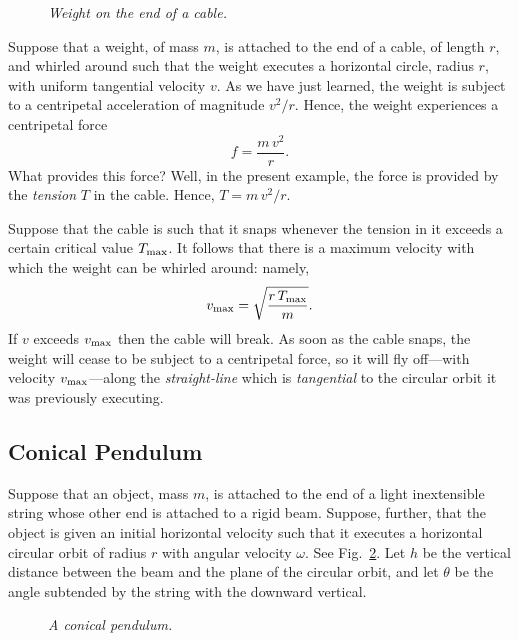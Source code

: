 \begin{figure}
\epsfysize=2.5in
\centerline{}
\caption{\em Weight on the end of a cable.}\label{f60}  
\end{figure}

Suppose that a weight, of mass $m$, is attached to the end of a cable, of
length $r$, and whirled around such that the weight executes a horizontal circle,
 radius $r$, with uniform tangential velocity $v$. As we have just learned,
the weight is subject to a centripetal acceleration of magnitude $v^2/r$. Hence,
the weight experiences a centripetal force
\begin{equation}
f = \frac{m\,v^2}{r}.
\end{equation}
What provides this force? Well, in the present example, the force is provided by the
{\em tension} $T$ in the cable. Hence, $T=m\,v^2/r$. 

Suppose that the cable is such that it  snaps whenever the tension in it
exceeds a certain critical value $T_{\rm max}$. It follows that there is a
maximum velocity with which the weight can be whirled around: namely,
\begin{equation}
v_{\rm max} = \sqrt{\frac{r\,T_{\rm max}}{m}}.
\end{equation}
If $v$ exceeds $v_{\rm max}$ then the cable  will  break. As soon as the cable snaps,
the weight will cease to be subject to a centripetal force, so it will fly off---with 
velocity $v_{\rm max}$---along the {\em straight-line}
which is {\em tangential} to the circular orbit it was previously executing.

\subsection{Conical Pendulum}
Suppose that an object, mass $m$, is attached to the end of a light inextensible
string whose other end is attached to a rigid beam. Suppose, further, that the
object is given an initial horizontal velocity such that it executes a
horizontal circular orbit of radius $r$ with angular velocity $\omega$. See
Fig.~\ref{f61}. Let $h$ be the vertical distance between the beam and the plane of
the circular orbit, and let $\theta$ be the angle subtended by the string with
the downward vertical.

\begin{figure}
\epsfysize=2.5in
\centerline{}
\caption{\em A conical pendulum.}\label{f61}  
\end{figure}

